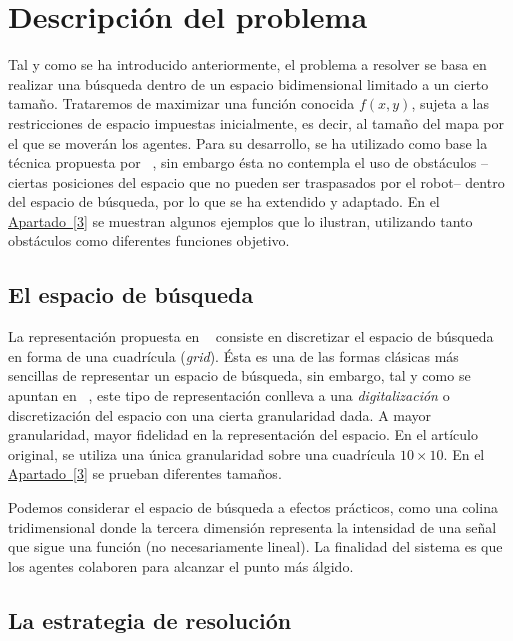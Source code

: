 \documentclass[runningheads]{llncs}
\newcommand{\refcruzada}[2]{\hyperref[#2]{#1~\ref{#2}}}
\begin{document}
    \section{Descripción del problema}
    \label{sec:descripcion}
    Tal y como se ha introducido anteriormente, el problema a resolver se basa en realizar una búsqueda dentro de un espacio bidimensional limitado a un cierto tamaño. Trataremos de maximizar una función conocida $f(x,y)$, sujeta a las restricciones de espacio impuestas inicialmente, es decir, al tamaño del mapa por el que se moverán los agentes.
    Para su desarrollo, se ha utilizado como base la técnica propuesta por ~\cite{initialPaper}, sin embargo ésta no contempla el uso de obstáculos --ciertas posiciones del espacio que no pueden ser traspasados por el robot-- dentro del espacio de búsqueda, por lo que se ha extendido y adaptado.
    En el \refcruzada{Apartado}{3} se muestran algunos ejemplos que lo ilustran, utilizando tanto obstáculos como diferentes funciones objetivo. %


    \subsection{El espacio de búsqueda}
    \label{sec:espacio}
    
    La representación propuesta en ~\cite{initialPaper} consiste en discretizar el espacio de búsqueda en forma de una cuadrícula (\textit{grid}). Ésta es una de las formas clásicas más sencillas de representar un espacio de búsqueda, sin embargo, tal y como se apuntan en ~\cite{AIRobotics}, este tipo de representación conlleva a una \textit{digitalización} o discretización del espacio con una cierta granularidad dada. A mayor granularidad, mayor fidelidad en la representación del espacio. En el artículo original, se utiliza una única granularidad sobre una cuadrícula $10 \times 10$. En el \refcruzada{Apartado}{3} se prueban diferentes tamaños. %

    Podemos considerar el espacio de búsqueda a efectos prácticos, como una colina tridimensional donde la tercera dimensión representa la intensidad de una señal que sigue una función (no necesariamente lineal). La finalidad del sistema es que los agentes colaboren para alcanzar el punto más álgido.

    \subsection{La estrategia de resolución}
\end{document}
